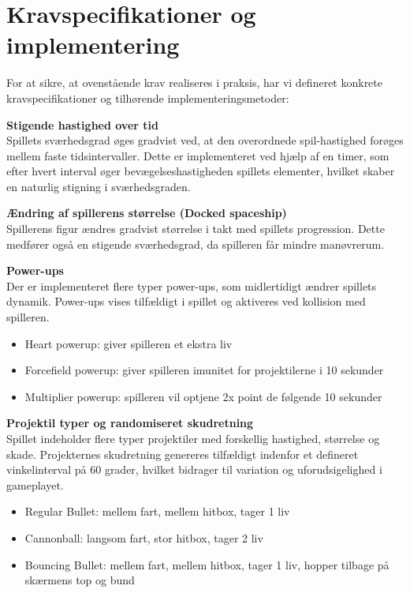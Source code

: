 \vspace{10em}

\section{Kravspecifikationer og implementering} \label{chap:ProduktUdvikling_sec:VoresKrav}
\vspace{0.5em}

For at sikre, at ovenstående krav realiseres i praksis, har vi defineret konkrete kravspecifikationer og tilhørende implementeringsmetoder:

\textbf{Stigende hastighed over tid}
\\Spillets sværhedsgrad øges gradvist ved, at den overordnede spil-hastighed forøges mellem faste tidsintervaller. Dette er implementeret ved hjælp af en timer, som efter hvert interval øger bevægelseshastigheden spillets elementer, hvilket skaber en naturlig stigning i sværhedsgraden.

\textbf{Ændring af spillerens størrelse (Docked spaceship)}
\\Spillerens figur ændres gradvist størrelse i takt med spillets progression. Dette medfører også en stigende sværhedsgrad, da spilleren får mindre manøvrerum. 

\textbf{Power-ups}
\\Der er implementeret flere typer power-ups, som midlertidigt ændrer spillets dynamik. Power-ups vises tilfældigt i spillet og aktiveres ved kollision med spilleren.
\vspace{-0.5em}
\begin{itemize}
    \setlength{\itemsep}{0pt}
    \setlength{\parskip}{1pt}
    \setlength{\parsep}{0pt}
    \item Heart powerup: giver spilleren et ekstra liv
    \item Forcefield powerup: giver spilleren imunitet for projektilerne i 10 sekunder
    \item Multiplier powerup: spilleren vil optjene 2x point de følgende 10 sekunder
\end{itemize}

\textbf{Projektil typer og randomiseret skudretning}
\\Spillet indeholder flere typer projektiler med forskellig hastighed, størrelse og skade. Projekternes skudretning genereres tilfældigt indenfor et defineret vinkelinterval på 60 grader, hvilket bidrager til variation og uforudsigelighed i gameplayet.
\vspace{-0.5em}
\begin{itemize}
    \setlength{\itemsep}{0pt}
    \setlength{\parskip}{1pt}
    \setlength{\parsep}{0pt}
    \item Regular Bullet: mellem fart, mellem hitbox, tager 1 liv
    \item Cannonball: langsom fart, stor hitbox, tager 2 liv
    \item Bouncing Bullet: mellem fart, mellem hitbox, tager 1 liv, hopper tilbage på skærmens top og bund
\end{itemize}

